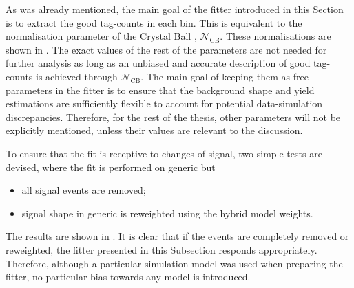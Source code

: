 As was already mentioned, the main goal of the \Mbc fitter introduced in this Section is to extract the good tag-\B counts in each \EB bin.
This is equivalent to the normalisation parameter of the Crystal Ball \PDF, $\mathcal{N}_{\mathrm{CB}}$.
These normalisations are shown in .
The exact values of the rest of the parameters are not needed for further analysis as long as an unbiased and accurate description of good tag-\B counts is achieved through $\mathcal{N}_{\mathrm{CB}}$.
The main goal of keeping them as free parameters in the fitter is to ensure that the \Mbc background shape and yield estimations are sufficiently flexible to account for potential data-simulation discrepancies.
Therefore, for the rest of the thesis, other parameters will not be explicitly mentioned, unless their values are relevant to the discussion.

To ensure that the fit is receptive to changes of \BtoXsgamma signal, two simple tests are devised, where the fit is performed on generic \MC but
\begin{itemize}
    \item all \BtoXsgamma signal events are removed;
    \item \BtoXsgamma signal shape in generic \MC is reweighted using the hybrid model weights.
\end{itemize}
The results are shown in .
It is clear that if the \BtoXsgamma events are completely removed or reweighted, the \Mbc fitter presented in this Subsection responds appropriately.
Therefore, although a particular simulation model was used when preparing the fitter, no particular bias towards any \BtoXsgamma model is introduced.


